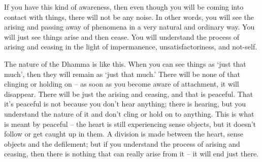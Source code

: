If you have this kind of awareness, then even though you will be coming
into contact with things, there will not be any noise. In other words, 
you will see the arising and passing away of phenomena in a very natural
and ordinary way. You will just see things arise and then cease. You
will understand the process of arising and ceasing in the light of
impermanence, unsatisfactoriness, and not-self. 

The nature of the Dhamma is like this. When you can see things as `just
that much', then they will remain as `just that much.' There will be
none of that clinging or holding on -- as soon as you become aware of
attachment, it will disappear. There will be just the arising and
ceasing, and that is peaceful. That it's peaceful is not because you
don't hear anything; there is hearing, but you understand the nature of
it and don't cling or hold on to anything. This is what is meant by
peaceful -- the heart is still experiencing sense objects, but it
doesn't follow or get caught up in them. A division is made between the
heart, sense objects and the defilement; but if you understand the
process of arising and ceasing, then there is nothing that can really
arise from it -- it will end just there. 
